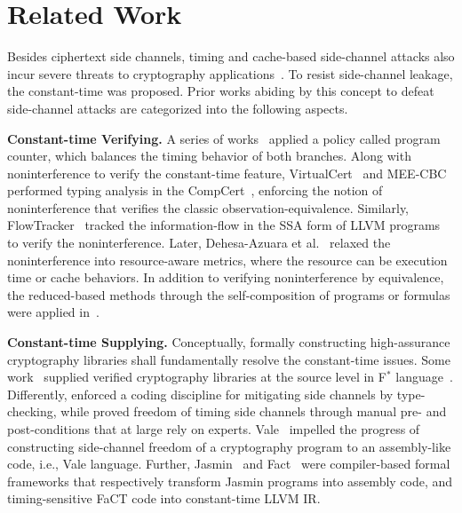 \section{Related Work}
\label{sec:related}

Besides ciphertext side channels, timing and cache-based side-channel attacks also incur severe threats to cryptography applications~\cite{percival2005cache, osvik2006cache, zhang2012cross, yarom2014flush, liu2015last, yarom2014recovering, ryan2019return, aranha2020ladderleak}. 
To resist side-channel leakage, the constant-time was proposed.
Prior works abiding by this concept to defeat side-channel attacks are categorized into the following aspects.


\noindent \textbf{Constant-time Verifying.}
A series of works~\cite{agat2000transforming, molnar2005program, barthe2006preventing, kopf2007transformational, almeida2013certified, mantel2015transforming} applied a policy called program counter, which balances the timing behavior of both branches.
Along with noninterference to verify the constant-time feature, VirtualCert~\cite{barthe2014system} and MEE-CBC~\cite{almeida2016verifiable} performed typing analysis in the CompCert~\cite{leroy2006formal}, enforcing the notion of noninterference that verifies the classic observation-equivalence.
Similarly, FlowTracker~\cite{rodrigues2016sparse} tracked the information-flow in the SSA form of LLVM programs to verify the noninterference.
Later, Dehesa-Azuara et al.~\cite{dehesa2017verifying} relaxed the noninterference into resource-aware metrics, where the resource can be execution time or cache behaviors.
In addition to verifying noninterference by equivalence, the reduced-based methods through the self-composition of programs or formulas were applied in~\cite{almeida2013formal, almeida2016verifying, chen2017precise, antonopoulos2017decomposition, yang2018lazy, blazy2019verifying, daniel2020binsec}.

\noindent \textbf{Constant-time Supplying.}
Conceptually, formally constructing high-assurance cryptography libraries shall fundamentally resolve the constant-time issues. 
Some work~\cite{zinzindohoue2016verified, zinzindohoue2017hacl} supplied verified cryptography libraries at the source level in F$^{*}$ language~\cite{swamy2016dependent}.
Differently, \cite{zinzindohoue2016verified} enforced a coding discipline for mitigating side channels by type-checking, while \cite{zinzindohoue2017hacl} proved freedom of timing side channels through manual pre- and post-conditions that at large rely on experts. 
Vale~\cite{bond2017vale} impelled the progress of constructing side-channel freedom of a cryptography program to an assembly-like code, i.e., Vale language. 
Further, Jasmin~\cite{almeida2017jasmin} and Fact~\cite{cauligi2019fact} were compiler-based formal frameworks that respectively transform Jasmin programs into assembly code, and timing-sensitive FaCT code into constant-time LLVM IR.

